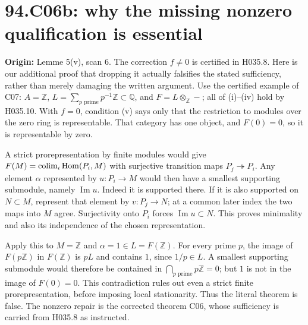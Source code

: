 \documentclass[11pt]{article}
\newcommand{\Hom}{\operatorname{Hom}}
\newcommand{\im}{\operatorname{Im}}
\newcommand{\colim}{\mathop{\rm colim}}
\begin{document}
\section{94.C06b: why the missing nonzero qualification is essential}
\label{C06b}
\textbf{Origin:} Lemme 5(v), scan 6. The correction $f\ne0$ is certified
in H035.8. Here is our additional proof that dropping it actually
falsifies the stated sufficiency, rather than merely damaging the
written argument. Use the certified example of C07:
$A=\mathbb Z$, $L=\sum_{p\text{ prime}}p^{-1}\mathbb Z\subset\mathbb Q$,
and $F=L\otimes_{\mathbb Z}-$; all of (i)--(iv) hold by H035.10.
With $f=0$, condition (v) says only that the restriction to modules
over the zero ring is representable. That category has one object,
and $F(0)=0$, so it is representable by zero.

A strict prorepresentation by finite modules would give
$F(M)=\colim_i\Hom(P_i,M)$ with surjective transition maps
$P_j\twoheadrightarrow P_i$. Any element $\alpha$ represented by
$u:P_i\to M$ would then have a smallest supporting submodule,
namely $\im u$. Indeed it is supported there. If it is also supported
on $N\subset M$, represent that element by $v:P_j\to N$; at a common
later index the two maps into $M$ agree. Surjectivity onto $P_i$
forces $\im u\subset N$. This proves minimality and also its
independence of the chosen representation.

Apply this to $M=\mathbb Z$ and $\alpha=1\in L=F(\mathbb Z)$.
For every prime $p$, the image of $F(p\mathbb Z)$ in $F(\mathbb Z)$
is $pL$ and contains $1$, since $1/p\in L$. A smallest supporting
submodule would therefore be contained in
$\bigcap_{p\text{ prime}}p\mathbb Z=0$; but $1$ is not in the image
of $F(0)=0$. This contradiction rules out even a strict finite
prorepresentation, before imposing local stationarity. Thus the
literal theorem is false. The nonzero repair is the corrected theorem
C06, whose sufficiency is carried from H035.8 as instructed.
\end{document}
